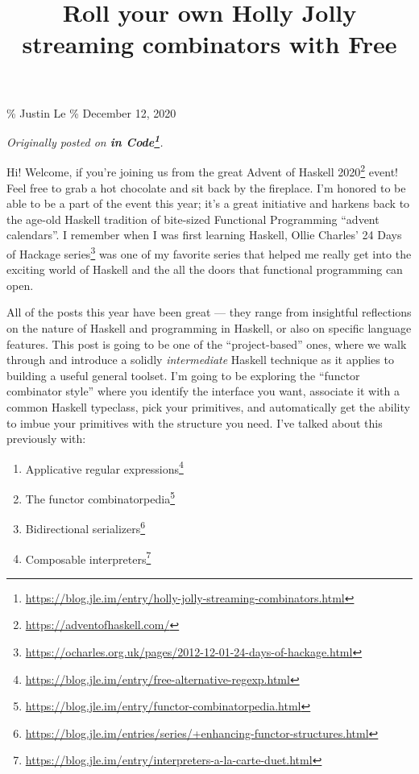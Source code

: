 \documentclass[]{article}
\title{Roll your own Holly Jolly streaming combinators with Free}
\renewcommand{\href}[2]{#2\footnote{\url{#1}}}
\begin{document}
\maketitle

\% Justin Le \% December 12, 2020

\emph{Originally posted on
\textbf{\href{https://blog.jle.im/entry/holly-jolly-streaming-combinators.html}{in
Code}}.}

Hi! Welcome, if you're joining us from the great
\href{https://adventofhaskell.com/}{Advent of Haskell 2020} event! Feel free to
grab a hot chocolate and sit back by the fireplace. I'm honored to be able to be
a part of the event this year; it's a great initiative and harkens back to the
age-old Haskell tradition of bite-sized Functional Programming ``advent
calendars''. I remember when I was first learning Haskell,
\href{https://ocharles.org.uk/pages/2012-12-01-24-days-of-hackage.html}{Ollie
Charles' 24 Days of Hackage series} was one of my favorite series that helped me
really get into the exciting world of Haskell and the all the doors that
functional programming can open.

All of the posts this year have been great --- they range from insightful
reflections on the nature of Haskell and programming in Haskell, or also on
specific language features. This post is going to be one of the
``project-based'' ones, where we walk through and introduce a solidly
\emph{intermediate} Haskell technique as it applies to building a useful general
toolset. I'm going to be exploring the ``functor combinator style'' where you
identify the interface you want, associate it with a common Haskell typeclass,
pick your primitives, and automatically get the ability to imbue your primitives
with the structure you need. I've talked about this previously with:

\begin{enumerate}
\def\labelenumi{\arabic{enumi}.}
\tightlist
\item
  \href{https://blog.jle.im/entry/free-alternative-regexp.html}{Applicative
  regular expressions}
\item
  \href{https://blog.jle.im/entry/functor-combinatorpedia.html}{The functor
  combinatorpedia}
\item
  \href{https://blog.jle.im/entries/series/+enhancing-functor-structures.html}{Bidirectional
  serializers}
\item
  \href{https://blog.jle.im/entry/interpreters-a-la-carte-duet.html}{Composable
  interpreters}
\end{enumerate}
\end{document}
